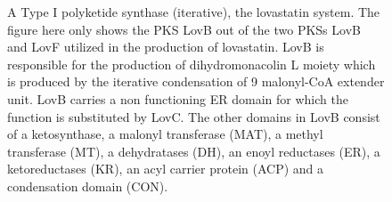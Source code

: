 			\setlength\fboxsep{5pt}
			\setlength\fboxrule{1.5pt}
			\begin{figure} [htbp]
			\centering
			\caption[A Type I polyketide synthase (iterative), the lovastatin system.]{ A Type I polyketide synthase (iterative), the lovastatin system. The figure here only shows the PKS LovB out of the two PKSs LovB and LovF utilized in the production of lovastatin. LovB is responsible for the production of dihydromonacolin L moiety which is produced by the iterative condensation of 9 malonyl-CoA extender unit. LovB carries a non functioning ER domain for which the function is substituted by LovC. The other domains in LovB consist of a ketosynthase, a malonyl transferase (MAT), a methyl transferase (MT), a dehydratases (DH), an enoyl reductases (ER), a ketoreductases (KR), an acyl carrier protein (ACP) and a condensation domain (CON).
			}
			\label{fig:lov}
			\end{figure}
			
